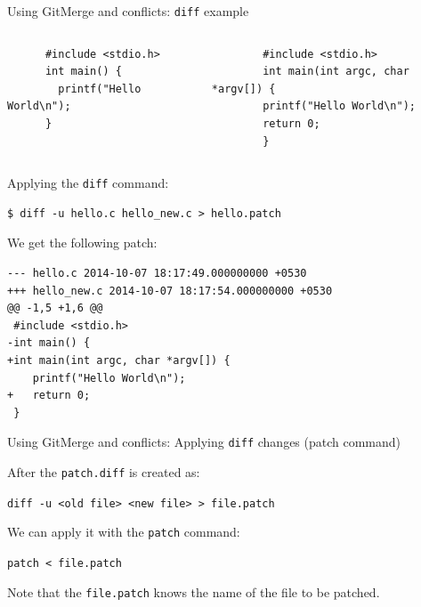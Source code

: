 \documentclass[10pt,compress]{beamer} %
\begin{document}
\begin{frame}[fragile]{Using Git}{Merge and conflicts: \texttt{diff} example}

\begin{scriptsize}
\begin{columns}
	  \begin{verbatim}
	  #include <stdio.h> 
	  int main() {
	    printf("Hello World\n");
	  }
	  \end{verbatim}
	  \begin{verbatim}
	    #include <stdio.h>
	    int main(int argc, char *argv[]) {
	    printf("Hello World\n");
	    return 0;
	    }
	  \end{verbatim}
\end{columns}

Applying the \texttt{diff} command:
\begin{verbatim}
$ diff -u hello.c hello_new.c > hello.patch
\end{verbatim}

We get the following patch:
\begin{verbatim}
--- hello.c	2014-10-07 18:17:49.000000000 +0530
+++ hello_new.c	2014-10-07 18:17:54.000000000 +0530
@@ -1,5 +1,6 @@
 #include <stdio.h>
-int main() {
+int main(int argc, char *argv[]) {
 	printf("Hello World\n");
+	return 0;
 }
\end{verbatim}
\end{scriptsize}


\end{frame}


\begin{frame}{Using Git}{Merge and conflicts: Applying \texttt{diff} changes (patch command)}

After the \texttt{patch.diff} is created as:

\texttt{diff -u <old file> <new file> > file.patch }

We can apply it with the \texttt{patch} command:

\texttt{patch < file.patch}

Note that the \texttt{file.patch} knows the name of the file to be patched.


\end{frame}

\end{document}
